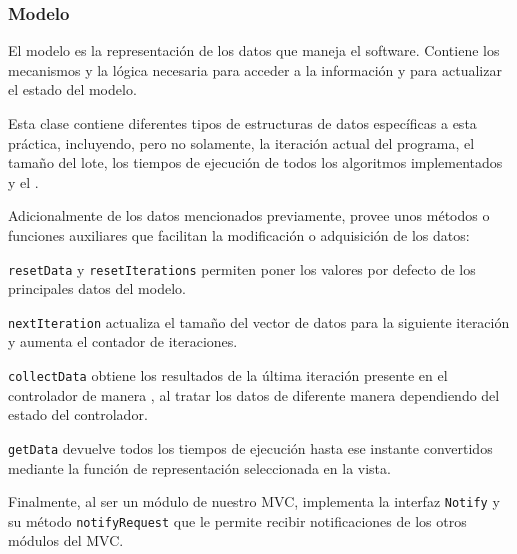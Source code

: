 \subsubsection{Modelo}

El modelo es la representación de los datos que maneja el software. Contiene los mecanismos y la lógica necesaria para acceder a la información y para actualizar el estado del modelo.\bigskip

Esta clase contiene diferentes tipos de estructuras de datos específicas a esta práctica, incluyendo, pero no solamente, la iteración actual del programa, el tamaño del lote, los tiempos de ejecución de todos los algoritmos implementados y el .\bigskip

Adicionalmente de los datos mencionados previamente, provee unos métodos o funciones auxiliares que facilitan la modificación o adquisición de los datos:\bigskip

\texttt{resetData} y \texttt{resetIterations} permiten poner los valores por defecto de los principales datos del modelo.\bigskip

\texttt{nextIteration} actualiza el tamaño del vector de datos para la siguiente iteración y aumenta el contador de iteraciones.\bigskip

\texttt{collectData} obtiene los resultados de la última iteración presente en el controlador de manera , al tratar los datos de diferente manera dependiendo del estado del controlador.\bigskip

\texttt{getData} devuelve todos los tiempos de ejecución hasta ese instante convertidos mediante la función de representación seleccionada en la vista.\bigskip

Finalmente, al ser un módulo de nuestro MVC, implementa la interfaz \texttt{Notify} y su método \texttt{notifyRequest} que le permite recibir notificaciones de los otros módulos del MVC.
